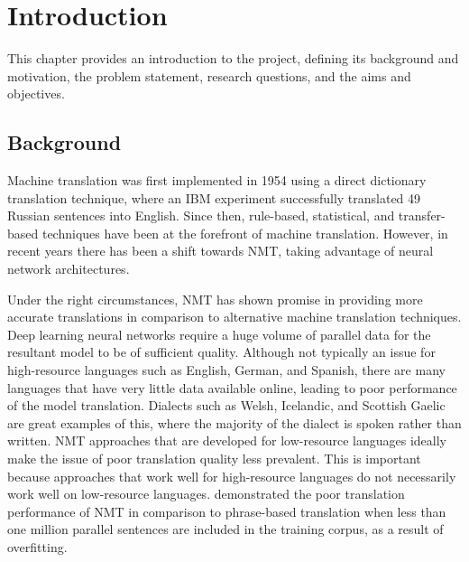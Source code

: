 \chapter{Introduction}
\label{introduction}
This chapter provides an introduction to the project, defining its background and motivation, the problem statement, research questions, and the aims and objectives.

\section{Background}
\label{Background and Motivation}
Machine translation was first implemented in 1954 using a direct dictionary translation technique, where an IBM experiment successfully translated 49 Russian sentences into English.
Since then, rule-based, statistical, and transfer-based techniques have been at the forefront of machine translation. However, in recent years there has been a shift towards \Gls{NMT}, taking advantage of neural network architectures.

Under the right circumstances, \acrshort{NMT} has shown promise in providing more accurate translations in comparison to alternative machine translation techniques. Deep learning neural networks require a huge volume of parallel data for the resultant model to be of sufficient quality. Although not typically an issue for high-resource languages such as English, German, and Spanish, there are many languages that have very little data available online, leading to poor performance of the model translation. Dialects such as Welsh, Icelandic, and Scottish Gaelic are great examples of this, where the majority of the dialect is spoken rather than written. \acrshort{NMT} approaches that are developed for low-resource languages ideally make the issue of poor translation quality less prevalent. This is important because approaches that work well for high-resource languages do not necessarily work well on low-resource languages. \cite{koehn_six_2017} demonstrated the poor translation performance of \acrshort{NMT} in comparison to phrase-based translation when less than one million parallel sentences are included in the training corpus, as a result of overfitting.


